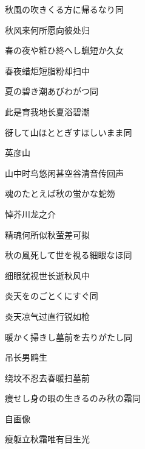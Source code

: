 \begin{haiku}
    {\FH 秋風の吹きくる方に帰るなり}\hfill{\FH 同}

    {\FK 秋风来何所愿向彼处归}
\end{haiku}

\begin{haiku}
    {\FH 春の夜や粧ひ終へし蝋短か}\hfill{\FH 久女}

    {\FK 春夜蜡炬短脂粉却扫中}
\end{haiku}

\begin{haiku}
    {\FH {}夏の碧き潮あびわがつ}\hfill{\FH 同}

    {\FK 此是育我地长夏浴碧潮}
\end{haiku}

\begin{haiku}
    {\FH 谺して山ほととぎすほしいまま}\hfill{\FH 同}

    {\FK 英彦山}

    {\FK 山中时鸟悠闲甚空谷清音传回声}
\end{haiku}

\begin{haiku}
    {\FH 魂のたとえば秋の蛍かな}\hfill{\FH 蛇笏}

    {\FK 悼芥川龙之介}

    {\FK 精魂何所似秋萤差可拟}
\end{haiku}

\begin{haiku}
    {\FH 秋の風死して世を視る細眼なほ}\hfill{\FH 同}

    {\FK 细眼犹视世长逝秋风中}
\end{haiku}

\begin{haiku}
    {\FH 炎天をのごとくにすぐ}\hfill{\FH 同}

    {\FK 炎天凉气过直行锐如枪}
\end{haiku}

\begin{haiku}
    {\FH 暖かく掃きし墓前を去りがたし}\hfill{\FH 同}

    {\FK 吊长男鸥生}

    {\FK 绕坟不忍去春暖扫墓前}
\end{haiku}

\begin{haiku}
    {\FH 痩せし身の眼の生きるのみ秋の霜}\hfill{\FH 同}

    {\FK 自画像}

    {\FK 瘦躯立秋霜唯有目生光}
\end{haiku}

